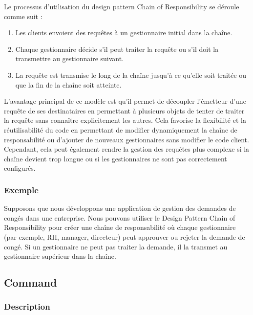 \documentclass[french]{article}
\begin{document}
Le processus d'utilisation du design pattern Chain of Responsibility se déroule comme suit :

\begin{enumerate}
    \item Les clients envoient des requêtes à un gestionnaire initial dans la chaîne.
    \item Chaque gestionnaire décide s'il peut traiter la requête ou s'il doit la transmettre au gestionnaire suivant.
    \item La requête est transmise le long de la chaîne jusqu'à ce qu'elle soit traitée ou que la fin de la chaîne soit atteinte.
\end{enumerate}

L'avantage principal de ce modèle est qu'il permet de découpler l'émetteur d'une requête de ses destinataires en permettant à plusieurs objets de tenter de traiter la requête sans connaître explicitement les autres. Cela favorise la flexibilité et la réutilisabilité du code en permettant de modifier dynamiquement la chaîne de responsabilité ou d'ajouter de nouveaux gestionnaires sans modifier le code client. Cependant, cela peut également rendre la gestion des requêtes plus complexe si la chaîne devient trop longue ou si les gestionnaires ne sont pas correctement configurés.


\subsubsection{Exemple}

Supposons que nous développons une application de gestion des demandes de congés dans une entreprise. Nous pouvons utiliser le Design Pattern Chain of Responsibility pour créer une chaîne de responsabilité où chaque gestionnaire (par exemple, RH, manager, directeur) peut approuver ou rejeter la demande de congé. Si un gestionnaire ne peut pas traiter la demande, il la transmet au gestionnaire supérieur dans la chaîne.




\newpage

\subsection{Command}

\subsubsection{Description}
\end{document}
